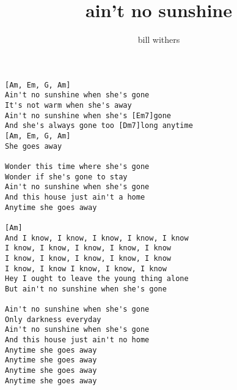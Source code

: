 \author{bill withers}
\title{ain't no sunshine}
\maketitle
\begin{verbatim}
[Am, Em, G, Am]
Ain't no sunshine when she's gone    
It's not warm when she's away   
Ain't no sunshine when she's [Em7]gone  
And she's always gone too [Dm7]long anytime   
[Am, Em, G, Am]
She goes away   
  
Wonder this time where she's gone   
Wonder if she's gone to stay   
Ain't no sunshine when she's gone  
And this house just ain't a home   
Anytime she goes away   

[Am]
And I know, I know, I know, I know, I know   
I know, I know, I know, I know, I know   
I know, I know, I know, I know, I know   
I know, I know I know, I know, I know   
Hey I ought to leave the young thing alone   
But ain't no sunshine when she's gone   
  
Ain't no sunshine when she's gone   
Only darkness everyday   
Ain't no sunshine when she's gone  
And this house just ain't no home   
Anytime she goes away   
Anytime she goes away   
Anytime she goes away   
Anytime she goes away   
\end{verbatim}